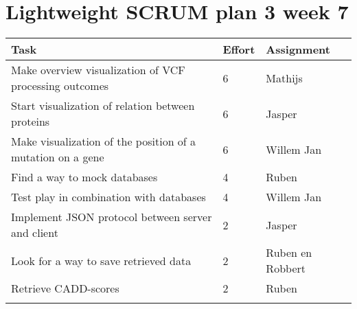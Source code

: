 \documentclass[a4paper]{report}
\begin{document}


\section*{Lightweight SCRUM plan 3 week 7}

\setlength\extrarowheight{5pt}
\begin{table}[ht]
\begin{tabular}{p{8cm}|p{2cm}|p{3cm}}

\textbf{Task} & \textbf{Effort} & \textbf{Assignment}\\
\hline \hline

Make overview visualization of VCF processing outcomes & 6 & Mathijs \\
Start visualization of relation between proteins & 6 & Jasper \\
Make visualization of the position of a mutation on a gene & 6 & Willem Jan\\
Find a way to mock databases & 4 & Ruben\\
Test play in combination with databases & 4 & Willem Jan\\
Implement JSON protocol between server and client & 2 & Jasper\\
Look for a way to save retrieved data & 2 & Ruben en Robbert\\
Retrieve CADD-scores & 2 & Ruben\\

\vspace{10pt} & \vspace{10pt} & \vspace{10pt}\\

\end{tabular}
\end{table}
\end{document}
